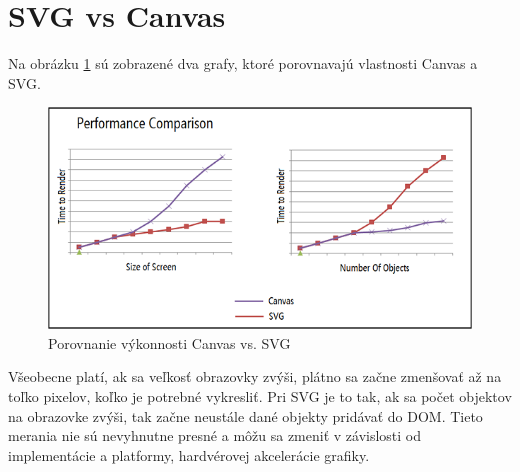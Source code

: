 \clearpage






\section{SVG vs Canvas}

Na obrázku \ref{fig:podpora23} sú zobrazené dva grafy, ktoré porovnavajú vlastnosti Canvas a SVG. 

 \begin{figure}[H]
\centering
\includegraphics[width=1\linewidth]{obrazky/porovnanie}
\caption{Porovnanie výkonnosti Canvas vs. SVG}
\label{fig:podpora23}
\end{figure}

Všeobecne platí, ak sa veľkosť obrazovky zvýši, plátno sa začne zmenšovať až na toľko pixelov, koľko je potrebné vykresliť. Pri SVG je to tak, ak sa počet objektov na obrazovke zvýši, tak začne neustále dané objekty pridávať do DOM. Tieto merania nie sú nevyhnutne presné a môžu sa zmeniť v závislosti od implementácie a platformy, hardvérovej akcelerácie grafiky. \cite{microsoft}



